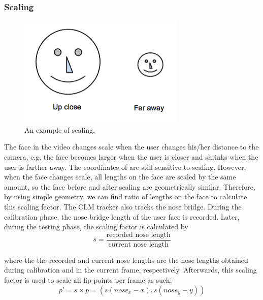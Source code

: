 \documentclass[10pt,twocolumn,letterpaper]{article}
\begin{document}
\subsubsection{Scaling}

\begin{figure}[h]
\centering
\includegraphics{bo3}
\caption{An example of scaling.}
\end{figure}

The face in the video changes scale when the user changes his/her distance to the camera, e.g. the face becomes larger when the user is closer and shrinks when the user is farther away. The coordinates of  are still sensitive to scaling. However, when the face changes scale, all lengths on the face are scaled by the same amount, so the face before and after scaling are geometrically similar. Therefore, by using simple geometry, we can find ratio of lengths on the face to calculate this scaling factor.
The CLM tracker also tracks the nose bridge. During the calibration phase, the nose bridge length of the user face is recorded. Later, during the testing phase, the scaling factor is calculated by
\begin{equation}
  s = \frac{\textrm{recorded nose length}}{\textrm{current nose length}}
\end{equation}

where the the recorded and current nose lengths are the nose lengths obtained during calibration and in the current frame, respectively. Afterwards, this scaling factor is used to scale all lip points per frame as such:
\begin{equation}
  p' = s \times p = (s(nose_x - x), s(nose_y - y))
\end{equation}
\end{document}
